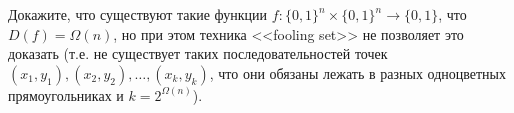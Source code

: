 Докажите, что существуют такие функции $f: \{0, 1\}^n \times \{0, 1\}^n \to \{0, 1\}$, что $D(f) =
\Omega(n)$, но при этом техника <<fooling set>> не позволяет это доказать (т.е. не существует таких
последовательностей точек $(x_1, y_1), (x_2, y_2), \dots, (x_k, y_k)$, что они обязаны лежать в разных
одноцветных прямоугольниках и $k = 2^{\Omega(n)}$).